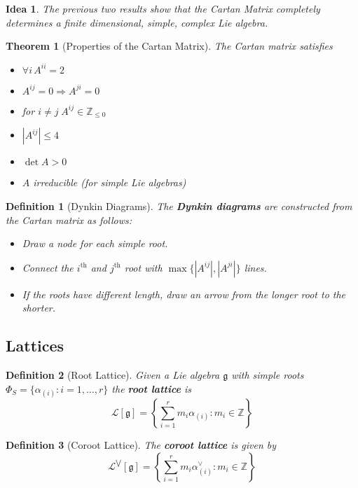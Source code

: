 \documentclass{article}
\newtheorem{theorem}{Theorem}[subsection]
\newtheorem{definition}{Definition}[subsection]
\newtheorem*{idea}{Idea}
\newcommand{\bam}[1]{\textbf{#1}}
\newcommand{\mf}[1]{\mathfrak{#1}}
\newcommand{\mbb}[1]{\mathbb{#1}}
\newcommand{\set}[1]{\lbrace #1 \rbrace}
\begin{document}
\begin{idea}
The previous two results show that the Cartan Matrix completely determines a finite dimensional, simple, complex Lie algebra. 
\end{idea}

\begin{theorem}[Properties of the Cartan Matrix]
The Cartan matrix satisfies
\begin{itemize}
    \item $\forall i \, A^{ii}=2$
    \item $A^{ij}=0 \Rightarrow A^{ji}=0$
    \item for $i \neq j \; A^{ij}\in\mbb{Z}_{\leq0}$
    \item $|A^{ij}|\leq4$
    \item $\det{A}>0$
    \item $A$ irreducible (for simple Lie algebras)
\end{itemize}
\end{theorem}

\begin{definition}[Dynkin Diagrams]
The \bam{Dynkin diagrams} are constructed from the Cartan matrix as follows:
\begin{itemize}
    \item Draw a node for each simple root.
    \item Connect the $i^{\text{th}}$ and $j^\text{th}$ root with $\max\set{  |A^{ij}|, |A^{ji}|  }$ lines. 
    \item If the roots have different length, draw an arrow from the longer root to the shorter. 
\end{itemize}
\end{definition}

\subsection{Lattices}

\begin{definition}[Root Lattice]
Given a Lie algebra $\mf{g}$ with simple roots $\Phi_S=\set{  \alpha_{(i)} : i=1,\dots,r  }$ the \bam{root lattice} is 
\[
\mathcal{L} [\mf{g}] = \left\{ \sum_{i=1}^r m_i \alpha_{(i)} : m_i \in\mbb{Z} \right\}
\]
\end{definition}

\begin{definition}[Coroot Lattice]
The \bam{coroot lattice} is given by 
\[
\mathcal{L}^{\bigvee} [\mf{g}] =\left\{ \sum_{i=1}^r m_i \alpha^\vee_{(i)} : m_i \in\mbb{Z} \right\}
\]
\end{definition}
\end{document}
